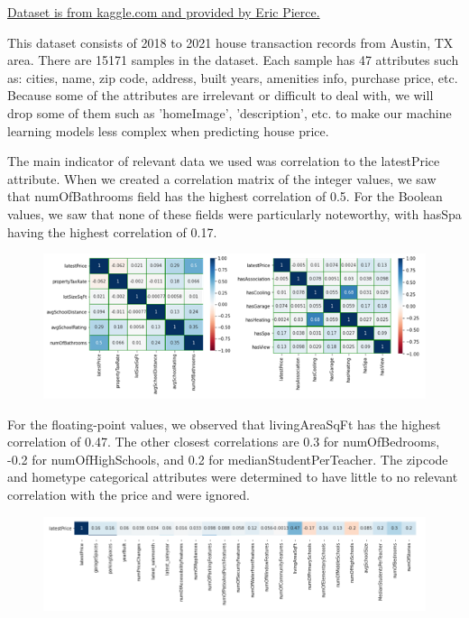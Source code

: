 \documentclass[12pt]{article}
\begin{document}
	\href{https://www.kaggle.com/ericpierce/austinhousingprices}{Dataset is from kaggle.com and provided by Eric Pierce.} 
	
	This dataset consists of 2018 to 2021 house transaction records from Austin, TX area. There are 15171 samples in the dataset. Each sample has 47 attributes such as: cities, name, zip code, address, built years, amenities info, purchase price, etc. Because some of the attributes are irrelevant or difficult to deal with, we will drop some of them such as 'homeImage', 'description', etc. to make our machine learning models less complex when predicting house price. 
	
	The main indicator of relevant data we used was correlation to the latestPrice attribute. When we created a correlation matrix of the integer values, we saw that numOfBathrooms field has the highest correlation of 0.5. For the Boolean values, we saw that none of these fields were particularly noteworthy, with hasSpa having the highest correlation of 0.17.
	
	\begin{figure}[H]
		\label{fig:fig2}
		\includegraphics[width=1\linewidth]{fig2}
	\end{figure}
	
	For the floating-point values, we observed that livingAreaSqFt has the highest correlation of 0.47. The other closest correlations are 0.3 for numOfBedrooms, -0.2 for numOfHighSchools, and 0.2 for medianStudentPerTeacher. The zipcode and hometype categorical attributes were determined to have little to no relevant correlation with the price and were ignored.
	
	\begin{figure}[H]
		\label{fig:fig3}
		\includegraphics[width=1\linewidth]{fig3recreate}
	\end{figure}
	
\end{document}
